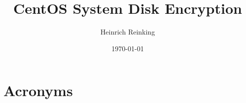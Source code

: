\documentclass[PMO,authoryear,toc]{lsstdoc}
\title{CentOS System Disk Encryption}
\author{%
Heinrich Reinking
}
\date {\today}
\begin{document}
\maketitle



\appendix
\renewcommand{\refname}{} %


\newpage
\section{Acronyms} \label{sec:acronyms}

\end{document}

